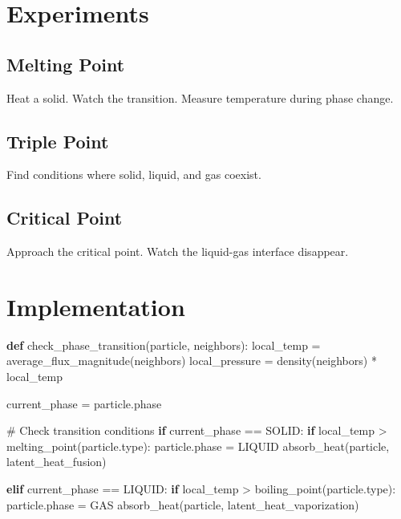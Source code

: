 \documentclass[
  11pt,
  letterpaper,
  twoside,
  openright]{book}
\newenvironment{Shaded}{\begin{snugshade}}{\end{snugshade}}
\newcommand{\BuiltInTok}[1]{\textcolor[rgb]{0.00,0.23,0.31}{#1}}
\newcommand{\CommentTok}[1]{\textcolor[rgb]{0.37,0.37,0.37}{#1}}
\newcommand{\ControlFlowTok}[1]{\textcolor[rgb]{0.00,0.23,0.31}{\textbf{#1}}}
\newcommand{\KeywordTok}[1]{\textcolor[rgb]{0.00,0.23,0.31}{\textbf{#1}}}
\newcommand{\NormalTok}[1]{\textcolor[rgb]{0.00,0.23,0.31}{#1}}
\newcommand{\OperatorTok}[1]{\textcolor[rgb]{0.37,0.37,0.37}{#1}}
\begin{document}
\section{Experiments}\label{experiments-9}

\subsection{Melting Point}\label{melting-point}

Heat a solid. Watch the transition. Measure temperature during phase
change.

\subsection{Triple Point}\label{triple-point}

Find conditions where solid, liquid, and gas coexist.

\subsection{Critical Point}\label{critical-point}

Approach the critical point. Watch the liquid-gas interface disappear.

\section{Implementation}\label{implementation-1}

\begin{Shaded}
\begin{Highlighting}[]
\KeywordTok{def}\NormalTok{ check\_phase\_transition(particle, neighbors):}
\NormalTok{    local\_temp }\OperatorTok{=}\NormalTok{ average\_flux\_magnitude(neighbors)}
\NormalTok{    local\_pressure }\OperatorTok{=}\NormalTok{ density(neighbors) }\OperatorTok{*}\NormalTok{ local\_temp}

\NormalTok{    current\_phase }\OperatorTok{=}\NormalTok{ particle.phase}

    \CommentTok{\# Check transition conditions}
    \ControlFlowTok{if}\NormalTok{ current\_phase }\OperatorTok{==}\NormalTok{ SOLID:}
        \ControlFlowTok{if}\NormalTok{ local\_temp }\OperatorTok{\textgreater{}}\NormalTok{ melting\_point(particle.}\BuiltInTok{type}\NormalTok{):}
\NormalTok{            particle.phase }\OperatorTok{=}\NormalTok{ LIQUID}
\NormalTok{            absorb\_heat(particle, latent\_heat\_fusion)}

    \ControlFlowTok{elif}\NormalTok{ current\_phase }\OperatorTok{==}\NormalTok{ LIQUID:}
        \ControlFlowTok{if}\NormalTok{ local\_temp }\OperatorTok{\textgreater{}}\NormalTok{ boiling\_point(particle.}\BuiltInTok{type}\NormalTok{):}
\NormalTok{            particle.phase }\OperatorTok{=}\NormalTok{ GAS}
\NormalTok{            absorb\_heat(particle, latent\_heat\_vaporization)}
\end{Highlighting}
\end{Shaded}
\end{document}
